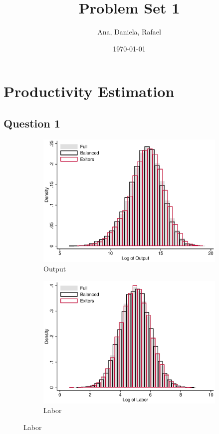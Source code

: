 \documentclass[11pt]{article}
\title{Problem Set 1}
\author{Ana, Daniela, Rafael}
\date{\today}
\begin{document}
\maketitle

\section*{Productivity Estimation}

\subsection*{Question 1}






\begin{figure}[ht]
	\caption{Distribution by samples}\label{fig:sumstat}
	\centering	
	\begin{subfigure}[b]{.3\textwidth}
		\centering
		\caption{Output}
		\includegraphics[width=\textwidth]{histY.eps}
	\end{subfigure}
	\begin{subfigure}[b]{.3\textwidth}
		\centering
		\caption{Labor}
		\includegraphics[width=\textwidth]{histL.eps}

\end{subfigure}
\end{figure}
\end{document}
